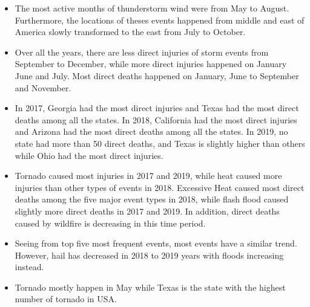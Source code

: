 \documentclass[
]{article}
\begin{document}
\begin{itemize}
\item
  The most active months of thunderstorm wind were from May to August. Furthermore, the locations of theses events happened from middle and east of America slowly transformed to the east from July to October.
\item
  Over all the years, there are less direct injuries of storm events from September to December, while more direct injuries happened on January June and July. Most direct deaths happened on January, June to September and November.
\item
  In 2017, Georgia had the most direct injuries and Texas had the most direct deaths among all the states. In 2018, California had the most direct injuries and Arizona had the most direct deaths among all the states. In 2019, no state had more than 50 direct deaths, and Texas is slightly higher than others while Ohio had the most direct injuries.
\item
  Tornado caused most injuries in 2017 and 2019, while heat caused more injuries than other types of events in 2018. Excessive Heat caused most direct deaths among the five major event types in 2018, while flash flood caused slightly more direct deaths in 2017 and 2019. In addition, direct deaths caused by wildfire is decreasing in this time period.
\item
  Seeing from top five most frequent events, most events have a similar trend. However, hail has decreased in 2018 to 2019 years with floods increasing instead.
\item
  Tornado mostly happen in May while Texas is the state with the highest number of tornado in USA.
  \clearpage
\end{itemize}

  
\end{document}
